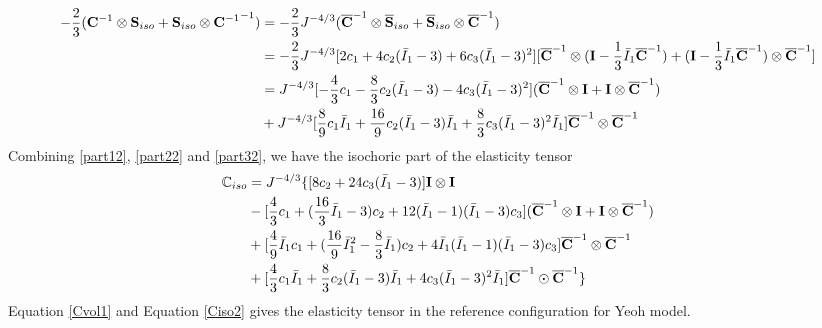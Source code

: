 \begin{equation} \label{part32}
\begin{split}
-\frac{2}{3}({\bold{C}}^{-1} \otimes {\bold{S}}_{iso} + {\bold{S}}_{iso} \otimes {{\bold{C}}^{-1}}^{-1}) 
&= 
-\frac{2}{3}J^{-4/3}({\overline{\bold{C}}}^{-1} \otimes {\overline{\bold{S}}}_{iso} + {\overline{\bold{S}}}_{iso} \otimes {\overline{{\bold{C}}}^{-1}}) \\
&=
-\frac{2}{3}J^{-4/3}[2c_1 + 4c_2({\bar{I}}_1 - 3) + 6c_3({\bar{I}}_1 - 3)^2]
[{\overline{\bold{C}}}^{-1} \otimes (\bold{I} - \frac{1}{3}{\bar{I}_1}{\overline{\bold{C}}}^{-1}) + 
(\bold{I} - \frac{1}{3}{\bar{I}_1}{\overline{\bold{C}}}^{-1}) \otimes {\overline{\bold{C}}}^{-1}]\\
&=
J^{-4/3}  [-\frac{4}{3}c_1 - \frac{8}{3}c_2({\bar{I}}_1 - 3) - 4c_3({\bar{I}}_1 - 3)^2] ({\overline{\bold{C}}}^{-1} \otimes \bold{I} + \bold{I} \otimes {\overline{\bold{C}}}^{-1}) \\
&+ J^{-4/3}  [\frac{8}{9}c_1{\bar{I}}_1 + \frac{16}{9}c_2({\bar{I}}_1 - 3){\bar{I}}_1 + \frac{8}{3}c_3({\bar{I}}_1 - 3)^2{\bar{I}}_1 ] {\overline{\bold{C}}}^{-1} \otimes {\overline{\bold{C}}}^{-1}
\end{split}
\end{equation}
Combining \ref{part12}, \ref{part22} and \ref{part32}, we have the isochoric part of the elasticity tensor
\begin{equation} \label{Ciso2}
\begin{split}
{\mathbb{C}}_{iso} &= J^{-4/3} \{
[8c_2+24c_3({\bar{I}}_1 - 3)] \bold{I} \otimes \bold{I} \\
&- [\frac{4}{3}c_1 + (\frac{16}{3}{\bar{I}}_1 - 3)c_2 + 12({\bar{I}}_1 - 1)({\bar{I}}_1 - 3)c_3]({\overline{\bold{C}}}^{-1} \otimes \bold{I} + \bold{I} \otimes {\overline{\bold{C}}}^{-1})\\
&+ [\frac{4}{9}{\bar{I}}_1c_1 + (\frac{16}{9}{{\bar{I}}_1}^2 - \frac{8}{3}{\bar{I}}_1)c_2 + 4{\bar{I}}_1({\bar{I}}_1 - 1)({\bar{I}}_1 - 3)c_3] {\overline{\bold{C}}}^{-1} \otimes {\overline{\bold{C}}}^{-1} \\
&+ [\frac{4}{3}c_1{\bar{I}}_1 + \frac{8}{3}c_2({\bar{I}}_1 - 3){\bar{I}}_1 + 4c_3({\bar{I}}_1 - 3)^2{\bar{I}}_1]{\overline{\bold{C}}}^{-1} \odot {\overline{\bold{C}}}^{-1}
\}
\end{split}
\end{equation}
Equation \ref{Cvol1} and Equation \ref{Ciso2} gives the elasticity tensor in the reference configuration for Yeoh model.


%
